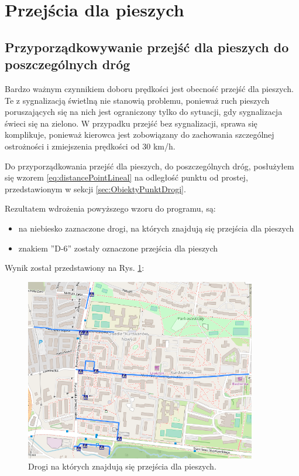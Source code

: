 \newpage
\section{Przejścia dla pieszych}
\label{sec:pedestrialCrossing}
\subsection{Przyporządkowywanie przejść dla pieszych do poszczególnych dróg}

Bardzo ważnym czynnikiem doboru prędkości jest obecność przejść dla pieszych. Te z sygnalizacją świetlną nie stanowią problemu, ponieważ ruch pieszych poruszających się na nich jest ograniczony tylko do sytuacji, gdy sygnalizacja świeci się na zielono. W przypadku przejść bez sygnalizacji, sprawa się komplikuje, ponieważ kierowca jest zobowiązany do zachowania szczególnej ostrożności i zmiejszenia prędkości od 30 km/h. 

Do przyporządkowania przejść dla pieszych, do poszczególnych dróg, posłużyłem się wzorem \ref{eq:distancePointLineal} na odległość punktu od prostej, przedstawionym w sekcji \ref{sec:ObiektyPunktDrogi}.


Rezultatem wdrożenia powyższego wzoru do programu, są:
\begin{itemize}
\item na niebiesko zaznaczone drogi, na których znajdują się przejścia dla pieszych
\item znakiem ''D-6'' zostały oznaczone przejścia dla pieszych
\end{itemize} 
Wynik został przedstawiony na Rys. \ref{sec:PrzejscieDrogi}:

\begin{figure}[h]
\caption{Drogi na których znajdują się przejścia dla pieszych.}
\label{sec:PrzejscieDrogi}
\centering
\includegraphics[width=0.9\textwidth]{PrzejscieDrogi}
\end{figure}


